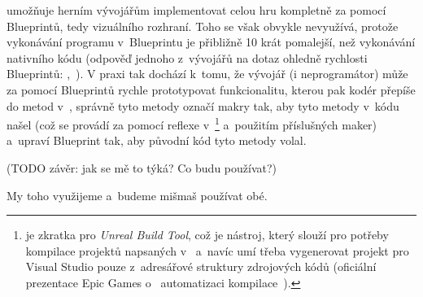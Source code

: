  \UE{} umožňuje herním vývojářům implementovat celou hru kompletně za pomocí Blueprintů, tedy vizuálního rozhraní. Toho se však obvykle nevyužívá, protože vykonávání programu v~Blueprintu je přibližně 10 krát pomalejší, než vykonávání nativního \CPP{} kódu (odpověď jednoho z~vývojářů \UE{} na dotaz ohledně rychlosti Blueprintů: ,~\citep{ue_performance}). V praxi tak dochází k~tomu, že vývojář (i neprogramátor) může za pomocí Blueprintů rychle prototypovat funkcionalitu, kterou pak kodér přepíše do metod v~\CPP{}, správně tyto metody označí makry tak, aby \UE{} tyto metody v~kódu našel (což se provádí za pomocí reflexe v~\UBT{}\footnote{\UBT{} je zkratka pro \textit{Unreal Build Tool}, což je \CS{} nástroj, který slouží pro potřeby kompilace projektů napsaných v~\UEu{} a~navíc umí třeba vygenerovat projekt pro Visual Studio pouze z~adresářové struktury zdrojových kódů (oficiální prezentace Epic Games o~ automatizaci kompilace~\citep{ue_ubt}).} a~použitím příslušných \CPP{} maker) a~upraví Blueprint tak, aby původní kód tyto metody volal.
 
 
  (TODO závěr: jak se mě to týká? Co budu používat?)
  
  My toho využijeme a~budeme mišmaš používat obé.

